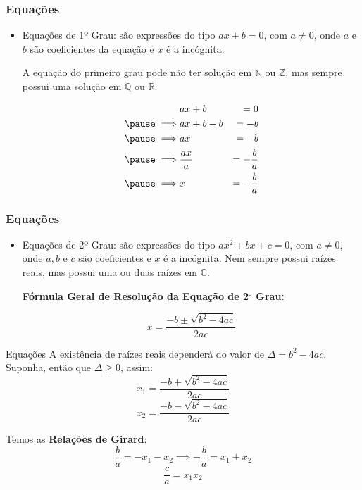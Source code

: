 \documentclass[hyperref={pdfpagelabels=false}]{beamer}
\begin{document}
\begin{frame}
\frametitle{Equações}

\begin{itemize}
 \item Equações de 1º Grau: \pause são expressões do tipo $ax+b=0$, com $a \neq 0$, onde $a$ e $b$ são coeficientes da equação e $x$ é a incógnita. \pause
 
A equação do primeiro grau pode não ter solução em $\mathbb{N}$ ou $\mathbb{Z}$, mas sempre possui uma solução em $\mathbb{Q}$ ou $\mathbb{R}$.

\begin{eqnarray*}
	&  ax + b & = 0 \\ \pause
	\implies & ax + b - b & = -b \\ \pause
	\implies & ax & = -b \\ \pause
	\implies & \displaystyle \frac{ax}{a} & = \displaystyle - \frac{b}{a}\\ \pause
	\implies & x & = \displaystyle - \frac{b}{a}
\end{eqnarray*}
 
 \end{itemize}

\end{frame}
 
 \begin{frame}
\frametitle{Equações}

\begin{itemize}
 \item Equações de 2º Grau: \pause são expressões do tipo $ax^{2} + bx + c = 0$, com $a \neq 0$, onde $a,b$ e $c$ são coeficientes e $x$ é a incógnita. Nem sempre possui raízes reais, mas possui uma ou duas raízes em $\mathbb{C}$. \pause
 
{\bf Fórmula Geral de Resolução da Equação de 2$^\circ$ Grau:}

\begin{equation}
x = \displaystyle \frac{-b \pm \displaystyle \sqrt{b^2 - 4ac}}{2ac}
\end{equation}
\end{itemize}

\end{frame}

\begin{frame}{Equações}
 A existência de raízes reais dependerá do valor de $\Delta = b^2 - 4ac$. Suponha, então que $\Delta \geq 0 $, assim:
$$x_1 = \displaystyle \frac{-b + \displaystyle \sqrt{b^2 - 4ac}}{2ac}$$
$$x_2 = \displaystyle \frac{-b - \displaystyle \sqrt{b^2 - 4ac}}{2ac}$$

\pause
Temos as {\bf Relações de Girard}:
$$\displaystyle \frac{b}{a} = -x_1 - x_2 \implies - \displaystyle \frac{b}{a} = x_1 + x_2$$
$$\displaystyle \frac{c}{a} = x_1 x_2$$
\end{frame}
\end{document}
